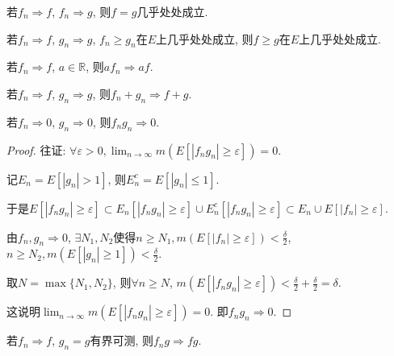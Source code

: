 \documentclass[theorem=false,mathfont=none,openany,sub3section]{easybook}
\begin{document}
\begin{example}
  若$f_n\Rightarrow f$, $f_n\Rightarrow g$, 则$f=g$几乎处处成立.\par
\end{example}

\begin{example}
  若$f_n\Rightarrow f$, $g_n\Rightarrow g$, $f_n\geqslant g_n$在$E$上几乎处处成立, 则$f\geqslant g$在$E$上几乎处处成立.\par
\end{example}

\begin{example}
  若$f_n\Rightarrow f$, $a\in \mathbb{R}$, 则$af_n\Rightarrow af$.\par  
  若$f_n\Rightarrow f$, $g_n \Rightarrow g$, 则$f_n+g_n\Rightarrow f+g$.\par
\end{example}

\begin{corollary}
  若$f_n\Rightarrow 0$, $g_n \Rightarrow 0$, 则$f_ng_n\Rightarrow 0$.\par
\end{corollary}

\begin{proof}
  往证: $\forall \varepsilon >0, \lim_{n \to \infty}m\left(E\left[|f_ng_n|\geqslant \varepsilon\right]\right) = 0$.\par
  记$E_n=E\left[|g_n|>1\right]$, 则$E_n^c=E\left[|g_n|\leqslant 1\right]$.\par
  于是$E\left[|f_ng_n|\geqslant \varepsilon\right]\subset E_n\left[|f_ng_n|\geqslant \varepsilon\right]\cup E_n^c\left[|f_ng_n|\geqslant \varepsilon\right]\subset E_n\cup E\left[|f_n|\geqslant \varepsilon\right]$.\par
  由$f_n,g_n \Rightarrow 0$, $\exists N_1,N_2$使得$n\geqslant N_1, m(E\left[|f_n|\geqslant \varepsilon\right])<\frac{\delta}{2}$, $n\geqslant N_2, m(E\left[|g_n|\geqslant 1\right])<\frac{\delta}{2}$.\par
  取$N = \max\{N_1,N_2\}$, 则$\forall n\geqslant N$, $m(E\left[|f_ng_n|\geqslant \varepsilon\right])<\frac{\delta}{2}+\frac{\delta}{2}=\delta$.\par
  这说明$\lim_{n \to \infty}m\left(E\left[|f_ng_n|\geqslant \varepsilon\right]\right) = 0$. 即$f_ng_n \Rightarrow 0$.\par
\end{proof}

\begin{corollary}
  若$f_n\Rightarrow f$, $g_n = g$有界可测, 则$f_ng\Rightarrow fg$.\par
\end{corollary}
\end{document}

